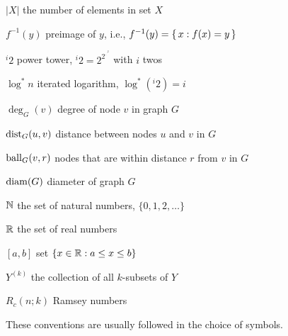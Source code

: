 

{\raggedright
\begin{notation}
    \item[$|X|$] the number of elements in set $X$
    \item[$f^{-1}(y)$] preimage of $y$, i.e., $f^{-1}(y) = \{\,  x : f(x) = y  \,\}$
    \item[${}^i 2$] power tower, ${}^i 2 = 2^{2^{\cdot^{\cdot^2}}}$ with $i$ twos
    \item[$\log^* n$] iterated logarithm, $\log^*({}^i 2) = i$
    \item[$\deg_G(v)$] degree of node $v$ in graph $G$
    \item[$\operatorname{dist}_G(u,v)$] distance between nodes $u$ and $v$ in $G$
    \item[$\operatorname{ball}_G(v,r)$] nodes that are within distance $r$ from $v$ in $G$
    \item[$\operatorname{diam}(G)$] diameter of graph $G$
    \item[$\mathbb{N}$] the set of natural numbers, $\{0,1,2,\dotsc\}$
    \item[$\mathbb{R}$] the set of real numbers
    \item[{$[a,b]$}] set $\{x \in \mathbb{R} : a \le x \le b\}$
    \item[$Y^{(k)}$] the collection of all $k$-subsets of $Y$
    \item[$R_c(n;k)$] Ramsey numbers
\end{notation}}


These conventions are usually followed in the choice of symbols.

